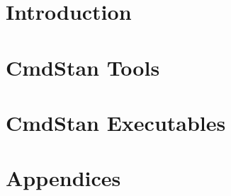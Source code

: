 \documentclass[10pt,openany]{book}
\newcommand{\CmdStan}{CmdStan\xspace}
\begin{document}
\pagestyle{plain}

\frontmatter

\tableofcontents

\mainmatter
\part{Introduction}



\part{\CmdStan Tools}




\part{\CmdStan Executables}



\appendix

\part*{Appendices}







\backmatter 
\end{document}
